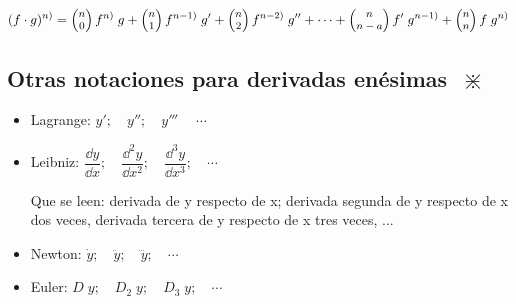	\begin{equation}
	\footnotesize{
		(f\cdot g)^{n)}=
		\left( \begin{matrix} n \\ 0 \end{matrix} \right) 
		f^{n)} \; g + 
		\left( \begin{matrix} n \\ 1 \end{matrix} \right)
		f^{n-1)}\; g' + 
		\left( \begin{matrix} n \\ 2 \end{matrix} \right) 
		f^{n-2)}\; g'' 
		+ \dots + 
		\left( \begin{matrix} n \\ n-a \end{matrix} \right)  
		f'\; g^{n-1)}+ 
		\left( \begin{matrix} n \\ n \end{matrix} \right) 
		f \; g^{n)} 
		}
	\end{equation}
	
	\subsection{Otras notaciones para derivadas enésimas $\; \divideontimes$ }
	
	\begin{itemize}
		\item \normalsize{Lagrange}: $y'; \quad y''; \quad y'''\; \quad \cdots$
		\item Leibniz: $\dfrac {\dd y}{\dd x}; \quad \dfrac {\dd^2 y}{\dd x^2}; \quad \dfrac {\dd^3 y}{\dd x^3}; \quad \cdots$ 
		
		Que se leen: derivada de y respecto de x; derivada segunda de y respecto de x dos veces, derivada tercera de y respecto de x tres veces, ...
		\item Newton: $\dot { y } ;\quad \ddot { y } ;\quad \dddot { y } ;\quad \cdots $
		\item Euler: $D\; y; \quad D_2\; y; \quad D_3\; y; \quad \cdots$ 
	\end{itemize}
	
	
	
